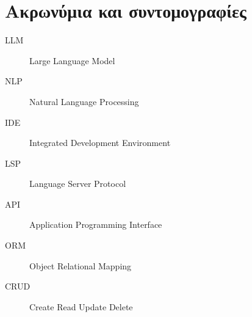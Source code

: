 \chapter{Ακρωνύμια και συντομογραφίες}

\begin{description}
  \item[LLM] Large Language Model
  \item[NLP] Natural Language Processing
  \item[IDE] Integrated Development Environment
  \item[LSP] Language Server Protocol
  \item[API] Application Programming Interface
  \item[ORM] Object Relational Mapping
  \item[CRUD] Create Read Update Delete
\end{description}
